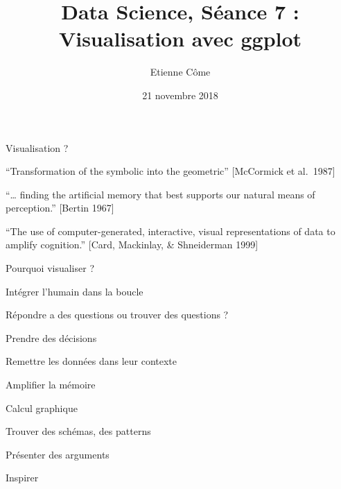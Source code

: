 \documentclass[ignorenonframetext,]{beamer}
\title{Data Science, Séance 7 : Visualisation avec ggplot}
\author{Etienne Côme}
\date{21 novembre 2018}
\begin{document}
\frame{\titlepage}

\begin{frame}{Visualisation ?}
\protect\hypertarget{visualisation}{}

``Transformation of the symbolic into the geometric'' {[}McCormick et
al.~1987{]}

``\ldots{} finding the artificial memory that best supports our natural
means of perception.'' {[}Bertin 1967{]}

``The use of computer-generated, interactive, visual representations of
data to amplify cognition.'' {[}Card, Mackinlay, \& Shneiderman 1999{]}

\end{frame}

\begin{frame}{Pourquoi visualiser ?}
\protect\hypertarget{pourquoi-visualiser}{}

\begin{block}{Intégrer l'humain dans la boucle}

Répondre a des questions ou trouver des questions ?

Prendre des décisions

Remettre les données dans leur contexte

Amplifier la mémoire

Calcul graphique

Trouver des schémas, des patterns

Présenter des arguments

Inspirer

\end{block}

\end{frame}
\end{document}
